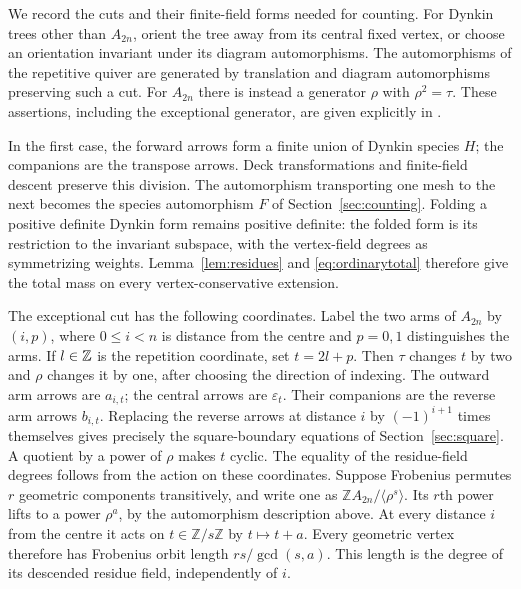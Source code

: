 We record the cuts and their finite-field forms needed for counting. For Dynkin trees other than $A_{2n}$, orient the tree away from its central fixed vertex, or choose an orientation invariant under its diagram automorphisms. The automorphisms of the repetitive quiver are generated by translation and diagram automorphisms preserving such a cut. For $A_{2n}$ there is instead a generator $\rho$ with $\rho^2=\tau$. These assertions, including the exceptional generator, are given explicitly in \cite[Proposition 10]{Bongartz23}. 

In the first case, the forward arrows form a finite union of Dynkin species $H$; the companions are the transpose arrows. Deck transformations and finite-field descent preserve this division. The automorphism transporting one mesh to the next becomes the species automorphism $F$ of Section~\ref{sec:counting}. Folding a positive definite Dynkin form remains positive definite: the folded form is its restriction to the invariant subspace, with the vertex-field degrees as symmetrizing weights. Lemma~\ref{lem:residues} and \eqref{eq:ordinarytotal} therefore give the total mass on every vertex-conservative extension.

The exceptional cut has the following coordinates. Label the two arms of $A_{2n}$ by $(i,p)$, where $0\leq i<n$ is distance from the centre and $p=0,1$ distinguishes the arms. If $l\in\mathbb Z$ is the repetition coordinate, set $t=2l+p$. Then $\tau$ changes $t$ by two and $\rho$ changes it by one, after choosing the direction of indexing. The outward arm arrows are $a_{i,t}$; the central arrows are $\varepsilon_t$. Their companions are the reverse arm arrows $b_{i,t}$. Replacing the reverse arrows at distance $i$ by $(-1)^{i+1}$ times themselves gives precisely the square-boundary equations of Section~\ref{sec:square}. A quotient by a power of $\rho$ makes $t$ cyclic. The equality of the residue-field degrees follows from the action on these coordinates. Suppose Frobenius permutes $r$ geometric components transitively, and write one as $\mathbb Z A_{2n}/\langle\rho^s\rangle$. Its $r$th power lifts to a power $\rho^a$, by the automorphism description above. At every distance $i$ from the centre it acts on $t\in\mathbb Z/s\mathbb Z$ by $t\mapsto t+a$. Every geometric vertex therefore has Frobenius orbit length $rs/\gcd(s,a)$. This length is the degree of its descended residue field, independently of $i$.

